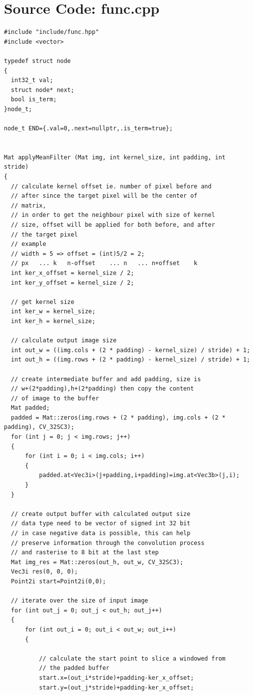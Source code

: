 \documentclass[12pt,a4paper]{report}
\begin{document}
\chapter{Source Code: func.cpp}
\begin{lstlisting}
#include "include/func.hpp"
#include <vector>

typedef struct node
{
  int32_t val;
  struct node* next;
  bool is_term;
}node_t;

node_t END={.val=0,.next=nullptr,.is_term=true};


Mat applyMeanFilter (Mat img, int kernel_size, int padding, int stride)
{
  // calculate kernel offset ie. number of pixel before and 
  // after since the target pixel will be the center of 
  // matrix,
  // in order to get the neighbour pixel with size of kernel
  // size, offset will be applied for both before, and after
  // the target pixel
  // example
  // width = 5 => offset = (int)5/2 = 2;
  // px   ... k   n-offset    ... n   ... n+offset    k
  int ker_x_offset = kernel_size / 2;
  int ker_y_offset = kernel_size / 2;

  // get kernel size
  int ker_w = kernel_size;
  int ker_h = kernel_size;

  // calculate output image size
  int out_w = ((img.cols + (2 * padding) - kernel_size) / stride) + 1;
  int out_h = ((img.rows + (2 * padding) - kernel_size) / stride) + 1;

  // create intermediate buffer and add padding, size is 
  // w+(2*padding),h+(2*padding) then copy the content 
  // of image to the buffer
  Mat padded;
  padded = Mat::zeros(img.rows + (2 * padding), img.cols + (2 * padding), CV_32SC3);
  for (int j = 0; j < img.rows; j++)
  {
      for (int i = 0; i < img.cols; i++)
      {
          padded.at<Vec3i>(j+padding,i+padding)=img.at<Vec3b>(j,i);
      }
  }
  
  // create output buffer with calculated output size
  // data type need to be vector of signed int 32 bit
  // in case negative data is possible, this can help
  // preserve information through the convolution process
  // and rasterise to 8 bit at the last step
  Mat img_res = Mat::zeros(out_h, out_w, CV_32SC3);
  Vec3i res(0, 0, 0);
  Point2i start=Point2i(0,0);

  // iterate over the size of input image
  for (int out_j = 0; out_j < out_h; out_j++)
  {
      for (int out_i = 0; out_i < out_w; out_i++)
      {
          
          // calculate the start point to slice a windowed from 
          // the padded buffer
          start.x=(out_i*stride)+padding-ker_x_offset;
          start.y=(out_j*stride)+padding-ker_x_offset;


\end{lstlisting}
\end{document}
